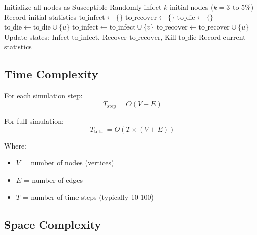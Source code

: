 \documentclass[12pt,a4paper]{article}
\begin{document}
\begin{algorithm}
\caption{SIR Simulation on Network}
\begin{algorithmic}[1]
\State Initialize all nodes as Susceptible
\State Randomly infect $k$ initial nodes ($k = 3$ to 5\%)
\State Record initial statistics
    \State $\text{to\_infect} \leftarrow \{\}$
    \State $\text{to\_recover} \leftarrow \{\}$
    \State $\text{to\_die} \leftarrow \{\}$
            \State $\text{to\_die} \leftarrow \text{to\_die} \cup \{u\}$
        \Else
                    \State $\text{to\_infect} \leftarrow \text{to\_infect} \cup \{v\}$
                \EndIf
            \EndFor
                \State $\text{to\_recover} \leftarrow \text{to\_recover} \cup \{u\}$
            \EndIf
        \EndIf
    \EndFor
    \State Update states: Infect $\text{to\_infect}$, Recover $\text{to\_recover}$, Kill $\text{to\_die}$
    \State Record current statistics
\EndWhile
\end{algorithmic}
\end{algorithm}

\subsection{Time Complexity}

For each simulation step:
\begin{equation}
T_{\text{step}} = O(V + E)
\end{equation}

For full simulation:
\begin{equation}
T_{\text{total}} = O(T \times (V + E))
\end{equation}

Where:
\begin{itemize}
    \item $V$ = number of nodes (vertices)
    \item $E$ = number of edges
    \item $T$ = number of time steps (typically 10-100)
\end{itemize}

\subsection{Space Complexity}
\end{document}
